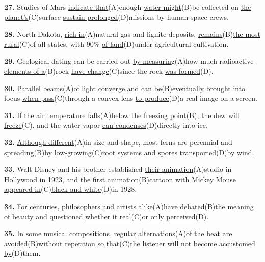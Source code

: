 \documentclass[12pt]{article}
\begin{document}
\noindent\textbf{27.} Studies of Mars \uline{indicate that}(A)enough \uline{water might}(B)be collected on \uline{the planet's}(C)surface \uline{sustain prolonged}(D)missions by human space crews.
\par
\vspace{\questionblockgap}
\noindent\textbf{28.} North Dakota, \uline{rich in}(A)natural gas and lignite deposits, \uline{remains}(B)\uline{the most rural}(C)of all states, with 90\% \uline{of land}(D)under agricultural cultivation.
\par
\vspace{\questionblockgap}
\noindent\textbf{29.} Geological dating can be carried out \uline{by measuring}(A)how much radioactive \uline{elements of a}(B)rock \uline{have change}(C)since the rock \uline{was formed}(D).
\par
\vspace{\questionblockgap}
\noindent\textbf{30.} \uline{Parallel beams}(A)of light converge and \uline{can be}(B)eventually brought into focus \uline{when pass}(C)through a convex lens \uline{to produce}(D)a real image on a screen.
\par
\vspace{\questionblockgap}
\noindent\textbf{31.} If the air \uline{temperature falls}(A)below the \uline{freezing point}(B), the dew \uline{will freeze}(C), and the water vapor \uline{can condenses}(D)directly into ice.
\par
\vspace{\questionblockgap}
\noindent\textbf{32.} \uline{Although different}(A)in size and shape, most ferns are perennial and \uline{spreading}(B)by \uline{low-growing}(C)root systems and spores \uline{transported}(D)by wind.
\par
\vspace{\questionblockgap}
\noindent\textbf{33.} Walt Disney and his brother established \uline{their animation}(A)studio in Hollywood in 1923, and the \uline{first animation}(B)cartoon with Mickey Mouse \uline{appeared in}(C)\uline{black and white}(D)in 1928.
\par
\vspace{\questionblockgap}
\noindent\textbf{34.} For centuries, philosophers and \uline{artists alike}(A)\uline{have debated}(B)the meaning of beauty and questioned \uline{whether it real}(C)or \uline{only perceived}(D).
\par
\vspace{\questionblockgap}
\noindent\textbf{35.} In some musical compositions, regular \uline{alternations}(A)of the beat \uline{are avoided}(B)without repetition \uline{so that}(C)the listener will not become \uline{accustomed by}(D)them.
\end{document}
